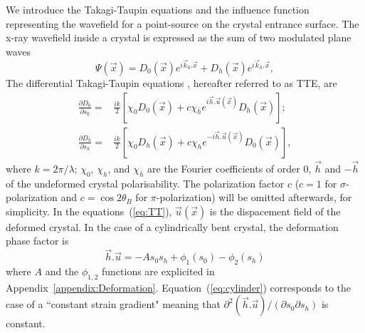 \documentclass[preprint]{iucr}              %
\begin{document}
We introduce the Takagi-Taupin equations and the influence function representing the wavefield for a point-source on the crystal entrance surface. The x-ray wavefield inside a crystal is expressed as the sum of two modulated plane waves
\begin{equation}
    \Psi(\vec x) = D_0(\vec x) e^{i \vec k_0 . \vec x} + D_h(\vec x) e^{i \vec k_h . \vec x},
\end{equation}
The differential Takagi-Taupin equations  \cite{Takagi1962, Takagi, Taupin, Taupin1967}, hereafter referred to as TTE, are
\begin{subequations}
\label{eq:TT}
\begin{align}
\frac{\partial D_0}{\partial s_0} =& \frac{ik}{2} \left[ \chi_0 D_0(\vec x)+c \chi_{\bar h} e^{i \vec h . \vec u (\vec x)} D_h(\vec x) \right]; \\
\frac{\partial D_h}{\partial s_h} =& \frac{ik}{2} \left[ \chi_0 D_h(\vec x)+c \chi_{h} e^{-i \vec h . \vec u (\vec x)} D_0(\vec x) \right],
\end{align}
\end{subequations}
where $k=2\pi/\lambda$; $\chi_0$, $\chi_h$, and $\chi_{\bar h}$ are the Fourier coefficients of order 0, $\vec h$ and $-\vec h$ of the undeformed crystal polarisability. The polarization factor $c$ ($c=1$ for $\sigma$-polarization and $c=\cos2\theta_B$  for $\pi$-polarization) will be omitted afterwards, for simplicity. 
In the equations~(\ref{eq:TT}), $\vec u (\vec x)$ is the dispacement field of the deformed crystal.
In the case of a cylindrically bent crystal, the deformation phase factor is
\begin{equation}
\label{eq:cylinder}
    \vec h . \vec u = -A s_0 s_h + \phi_1(s_0) - \phi_2(s_h)
\end{equation}
where $A$ and the $\phi_{1,2}$ functions are explicited in Appendix~\ref{appendix:Deformation}.
Equation~(\ref{eq:cylinder}) corresponds to the case of a ``constant strain gradient" \cite{authierbook} meaning that $\partial^2(\vec h . \vec u)/(\partial s_0 \partial s_h)$ is constant.
\end{document}
